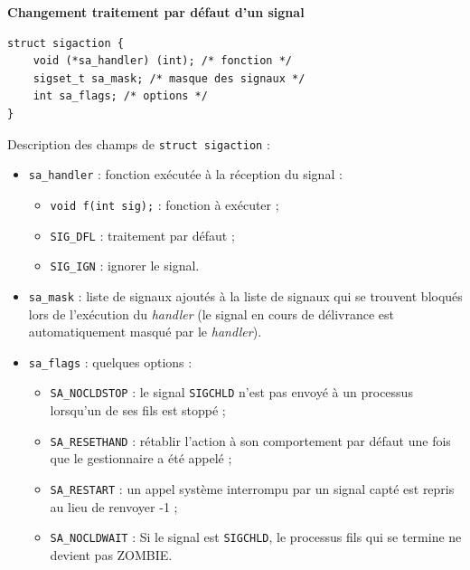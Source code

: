 \documentclass[french]{scrartcl}
\begin{document}
\begin{multicols}{3}
\vskip 5pt
\textbf{Changement traitement par défaut d'un signal}
\vspace{-7pt}\begin{lstlisting}
struct sigaction { 
	void (*sa_handler) (int); /* fonction */
	sigset_t sa_mask; /* masque des signaux */
	int sa_flags; /* options */
}
\end{lstlisting}\vspace{-7pt}
Description des champs de \lstinline!struct sigaction! : \begin{itemize}
	\item \lstinline!sa_handler! : fonction exécutée à la réception du signal :\begin{itemize}
		\item \lstinline!void f(int sig);! : fonction à exécuter ;
		\item \lstinline!SIG_DFL! : traitement par défaut ;
		\item \lstinline!SIG_IGN! : ignorer le signal.
	\end{itemize}
	\item \lstinline!sa_mask! : liste de signaux ajoutés à la liste de signaux qui se trouvent bloqués lors de l'exécution du \emph{handler} (le signal en cours de délivrance est automatiquement masqué par le \emph{handler}).
	\item \lstinline!sa_flags! : quelques options : \begin{itemize}
		\item \lstinline!SA_NOCLDSTOP! : le signal \lstinline!SIGCHLD! n'est pas envoyé à un processus lorsqu'un de ses fils est stoppé ;
		\item \lstinline!SA_RESETHAND! : rétablir l'action à son comportement par défaut une fois que le gestionnaire a été appelé ;
		\item \lstinline!SA_RESTART! : un appel système interrompu par un signal capté est repris au lieu de renvoyer -1 ;
		\item \lstinline!SA_NOCLDWAIT! : Si le signal est \lstinline!SIGCHLD!, le processus fils qui se termine ne devient pas ZOMBIE.
	\end{itemize}
\end{itemize}



\end{multicols}
\end{document}
